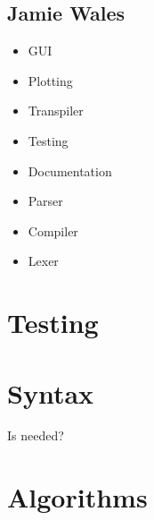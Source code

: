 \documentclass[a4paper, oneside, 11pt]{report}
\begin{document}
\section{Jamie Wales}\label{sec:jamie-wales}

\begin{itemize}
    \item GUI
    \item Plotting
    \item Transpiler
    \item Testing
    \item Documentation
    \item Parser
    \item Compiler
    \item Lexer
\end{itemize}

\chapter{Testing}\label{ch:test}



\chapter{Syntax}\label{ch:other-stuff}

Is needed?
    
\chapter{Algorithms}\label{ch:algorithms}


\end{document}
